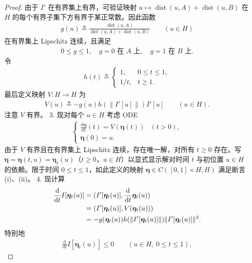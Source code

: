\documentclass[../../main.tex]{subfiles}
\begin{document}
\begin{theorem}[形变定理]
\begin{proof}
由于 $I'$ 在有界集上有界，可验证映射 $u\mapsto\operatorname{dist}(u,A)+\operatorname{dist}(u,B)$ 在 $H$ 的每个有界子集下方有界于某正常数。因此函数
\begin{align*}
g(u)\triangleq\frac{\operatorname{dist}(u,A)}{\operatorname{dist}(u,A)+\operatorname{dist}(u,B)}\qquad (u\in H)
\end{align*}
在有界集上 Lipschitz 连续，且满足
\begin{align}
0\leqslant g\leqslant 1,\quad g=0\text{ 在 }A\text{ 上},\quad g=1\text{ 在 }B\text{ 上}.\label{align:ch08-5-eq08}
\end{align}
令
\begin{align}
h(t)\triangleq\begin{cases}1,&0\leqslant t\leqslant 1,\\1/t,&t\geqslant 1.\end{cases}\label{align:ch08-5-eq09}
\end{align}
最后定义映射 $V:H\to H$ 为
\begin{align}
V(u)\triangleq -g(u)h(\|I'[u]\|)I'[u]\qquad (u\in H).\label{align:ch08-5-eq10}
\end{align}
注意 $V$ 有界。
3. 现对每个 $u\in H$ 考虑 ODE
\begin{align}
\begin{cases}
\frac{\mathrm{d}\boldsymbol{\eta}}{\mathrm{d}t}(t)=V(\boldsymbol{\eta}(t))&(t>0),\\
\boldsymbol{\eta}(0)=u.
\end{cases}\label{align:ch08-5-eq11}
\end{align}
由于 $V$ 有界且在有界集上 Lipschitz 连续，存在唯一解，对所有 $t\geqslant 0$ 存在。写 $\boldsymbol{\eta}=\boldsymbol{\eta}(t,u)=\boldsymbol{\eta}_t(u)$（$t\geqslant 0$，$u\in H$）以显式显示解对时间 $t$ 与初位置 $u\in H$ 的依赖。限于时间 $0\leqslant t\leqslant 1$，如此定义的映射 $\boldsymbol{\eta}\in C([0,1]\times H;H)$ 满足断言 (i)、(ii)。
4. 现计算
\begin{align}
\frac{\mathrm{d}}{\mathrm{d}t}I[\boldsymbol{\eta}_t(u)]&=(I'[\boldsymbol{\eta}_t(u)],\frac{\mathrm{d}}{\mathrm{d}t}\boldsymbol{\eta}_t(u))\notag\\
&=(I'[\boldsymbol{\eta}_t(u)],V(\boldsymbol{\eta}_t(u)))\notag\\
&=-g(\boldsymbol{\eta}_t(u))h(\|I'[\boldsymbol{\eta}_t(u)]\|)\|I'[\boldsymbol{\eta}_t(u)]\|^2.\label{align:ch08-5-eq12}
\end{align}
特别地
\begin{align*}
\frac{\mathrm{d}}{\mathrm{d}t}I[\boldsymbol{\eta}_t(u)]\leqslant 0\qquad (u\in H,\ 0\leqslant t\leqslant 1),

\end{align*}
\end{proof}
\end{theorem}
\end{document}
